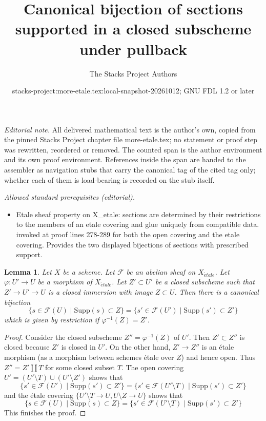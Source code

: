 \documentclass{stacks-project}
\title{Canonical bijection of sections supported in a closed subscheme under pullback}
\author{The Stacks Project Authors}
\date{stacks-project:more-etale.tex:local-snapshot-20261012; GNU FDL 1.2 or later}
\theoremstyle{plain}
\newtheorem{lemma}[subsection]{Lemma}
\theoremstyle{definition}
\theoremstyle{remark}
\numberwithin{equation}{subsection}
\def\etale{{\acute{e}tale}}
\begin{document}
\maketitle
\setcounter{subsection}{1}
\noindent\textit{Editorial note.} All delivered mathematical text is the author's own, copied from the pinned Stacks Project chapter file more-etale.tex; no statement or proof step was rewritten, reordered or removed. The counted span is the author environment and its own proof environment. References inside the span are handed to the assembler as navigation stubs that carry the canonical tag of the cited tag only; whether each of them is load-bearing is recorded on the stub itself.\par\medskip
\noindent\textit{Allowed standard prerequisites (editorial).}\begin{itemize}
\item Etale sheaf property on X\_etale: sections are determined by their restrictions to the members of an etale covering and glue uniquely from compatible data. invoked at proof lines 278-289 for both the open covering and the etale covering. Provides the two displayed bijections of sections with prescribed support.
\end{itemize}\medskip
\begin{lemma}
\label{lemma-section-support-in-locally-closed-pre}
Let $X$ be a scheme. Let $\mathcal{F}$ be an abelian sheaf on $X_\etale$.
Let $\varphi : U' \to U$ be a morphism of $X_\etale$. Let $Z' \subset U'$ be a
closed subscheme such that $Z' \to U' \to U$ is a closed immersion
with image $Z \subset U$. Then there is a canonical bijection
$$
\{s \in \mathcal{F}(U) \mid \text{Supp}(s) \subset Z\} =
\{s' \in \mathcal{F}(U') \mid \text{Supp}(s') \subset Z'\}
$$
which is given by restriction if $\varphi^{-1}(Z) = Z'$.
\end{lemma}

\begin{proof}
Consider the closed subscheme $Z'' = \varphi^{-1}(Z)$ of $U'$.
Then $Z' \subset Z''$ is closed because $Z'$ is closed in $U'$.
On the other hand, $Z' \to Z''$ is an \'etale morphism
(as a morphism between schemes \'etale over $Z$) and hence
open. Thus $Z'' = Z' \amalg T$ for some closed subset $T$.
The open covering $U' = (U' \setminus T) \cup (U' \setminus Z')$
shows that
$$
\{s' \in \mathcal{F}(U') \mid \text{Supp}(s') \subset Z'\} =
\{s' \in \mathcal{F}(U' \setminus T) \mid \text{Supp}(s') \subset Z'\}
$$
and the \'etale covering $\{U' \setminus T \to U, U \setminus Z \to U\}$
shows that
$$
\{s \in \mathcal{F}(U) \mid \text{Supp}(s) \subset Z\} =
\{s' \in \mathcal{F}(U' \setminus T) \mid \text{Supp}(s') \subset Z'\}
$$
This finishes the proof.
\end{proof}
\end{document}
